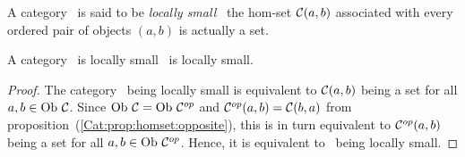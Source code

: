\begin{defin}\label{Cat:def:locally:small}
    A category \Cat\ is said to be {\em locally small} \ifand\ the hom-set
    $\mbox{$\cal C$}(a,b)$ associated with every ordered pair of objects $(a,b)$ is 
    actually a set.
\end{defin}

\begin{prop}\label{Cat:prop:locally:small:opposite}
    A category \Cat\ is locally small \ifand\ \Cop is locally small.
\end{prop}
\begin{proof}
    The category \Cat\ being locally small is equivalent to $\mbox{$\cal C$}(a,b)$
    being a set for all $a,b\in\mbox{\rm Ob}\ \mbox{$\cal C$}$. Since $\mbox{\rm Ob}\ \mbox{$\cal C$}=\mbox{\rm Ob}\ \mbox{${\cal C}^{op}$}$
    and $\mbox{${\cal C}^{op}$}(a,b)=\mbox{$\cal C$}(b,a)$ from 
    proposition~(\ref{Cat:prop:homset:opposite}), this is in turn equivalent 
    to $\mbox{${\cal C}^{op}$}(a,b)$ being a set for all $a,b\in\mbox{\rm Ob}\ \mbox{${\cal C}^{op}$}$. Hence, it is
    equivalent to \Cop\ being locally small.
\end{proof}

